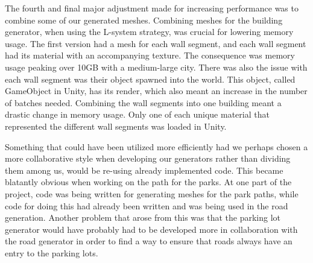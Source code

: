 The fourth and final major adjustment made for increasing performance was to combine some of our generated meshes. 
Combining meshes for the building generator, when using the L-system strategy, was crucial for lowering memory usage. 
The first version had a mesh for each wall segment, and each wall segment had its material with an accompanying texture. 
The consequence was memory usage peaking over 10GB with a medium-large city. 
There was also the issue with each wall segment was their object spawned into the world.
This object, called GameObject in Unity, has its render, which also meant an increase in the number of batches needed.
Combining the wall segments into one building meant a drastic change in memory usage. 
Only one of each unique material that represented the different wall segments was loaded in Unity.   

Something that could have been utilized more efficiently had we perhaps chosen a more collaborative style when developing our generators rather than dividing them among us, would be re-using already implemented code. 
This became blatantly obvious when working on the path for the parks.
At one part of the project, code was being written for generating meshes for the park paths, while code for doing this had already been written and was being used in the road generation. 
Another problem that arose from this was that the parking lot generator would have probably had to be developed more in collaboration with the road generator in order to find a way to ensure that roads always have an entry to the parking lots.

